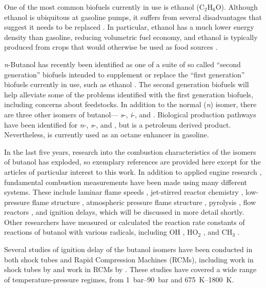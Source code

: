 \documentclass[../main.tex]{subfiles}
\begin{document}
One of the most common biofuels currently in use is ethanol (C$_2$H$_6$O).
Although ethanol is ubiquitous at gasoline pumps, it suffers from several
disadvantages that suggest it needs to be replaced \cite{Niven2005}. In particular, ethanol
has a much lower energy density than gasoline, reducing volumetric fuel
economy, and ethanol is typically produced from crops that would otherwise
be used as food sources \cite{Somma2009}.

\textit{n}-Butanol has recently been identified as one of a suite of so
called ``second generation'' biofuels intended to supplement or replace
the ``first generation'' biofuels currently in use, such as ethanol \cite{Harvey2011,Nigam2011}.
The second generation biofuels will help alleviate some of the problems
identified with the first generation biofuels, including concerns about
feedstocks. In addition to the normal (\textit{n}) isomer, there are three
other isomers of butanol--- \textit{s}-, \textit{i}-, and \tBuOH{}.
Biological production pathways have been identified for \textit{n}-, \textit{s}-,
and \iBuOH{} \cite{Nigam2011,Smith2010}, but \tBuOH{} is a petroleum derived product.
Nevertheless, \tBuOH{} is currently used as an octane enhancer in gasoline.

In the last five years, research into the combustion characteristics of
the isomers of butanol has exploded, so exemplary references are
provided here except for the articles of particular interest to this work.
In addition to applied engine research \cite{Dernotte2009, Szwaja2010, Kim2011},
fundamental combustion measurements have been made using many different
systems. These include laminar flame speeds \cite{Veloo2011a}, jet-stirred reactor
chemistry \cite{Dagaut2009}, low-pressure flame structure \cite{Hansen2011a,Hansen2013},
atmospheric pressure flame structure \cite{Grana2010}, pyrolysis \cite{VanGeem2010, Cai2012, Cai2013},
flow reactors \cite{Lefkowitz2012,Heyne2013}, and ignition delays, which will be discussed
in more detail shortly. Other researchers have measured or calculated the reaction
rate constants of reactions of butanol with various radicals, including OH \cite{Stranic2013a,
Pang2012, Pang2012a, Seal2013, Pang2012b, El-Nahas2012, Zhou2011, Moc2010, Vasu2010}, HO$_2$
\cite{Zhou2012, Alecu2012, Black2010a}, and CH$_3$ \cite{Katsikadakos2013, Katsikadakos2012}.

Several studies of ignition delay of the butanol isomers have been conducted
in both shock tubes and Rapid Compression Machines (RCMs), including work in shock tubes by \textcite{Moss2008,
Black2010, Noorani2010, Zhang2012, Stranic2012, Yasunaga2012, Heufer2011,
Vranckx2011, Zhu2014} and work in RCMs by \textcite{Weber2011,
Weber2013, Weber2013a, Karwat2011a}. These studies have covered a wide range of
temperature-pressure regimes, from \SIrange{1}{90}{\bar} and \SIrange{675}{1800}{\kelvin}.
\end{document}
